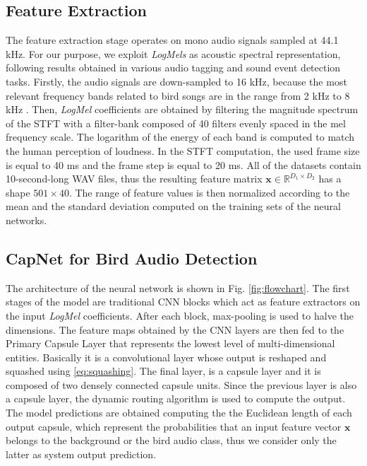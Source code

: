 \subsection{Feature Extraction}

The feature extraction stage operates on mono audio signals sampled at 44.1 kHz. For our purpose, we exploit \textit{LogMels} as acoustic spectral representation, following results obtained in various audio tagging and sound
event detection tasks. Firstly, the audio signals are down-sampled to 16 kHz, because the most relevant frequency bands related to bird songs are in the range from 2 kHz to 8 kHz \cite{payne2010handbook}. Then, \textit{LogMel} coefficients are obtained by filtering the magnitude spectrum of the STFT with a filter-bank composed of 40 filters evenly spaced in the mel frequency scale. The logarithm of the energy of each band is computed to match the human perception of loudness. In the STFT computation, the used frame size is equal to 40 ms and the frame step is equal to 20 ms. 
All of the datasets contain 10-second-long WAV files, thus the resulting feature matrix $\mathbf{x} \in \mathbb{R}^{D_1\times D_2}$ has a shape $501\times40$.
The range of feature values is then normalized according to the mean and the standard deviation computed on the training sets of the neural networks.


\subsection{CapNet for Bird Audio Detection}
The architecture of the neural network is shown in Fig. \ref{fig:flowchart}. The first stages of the model are traditional CNN blocks which act as feature extractors on the input \textit{LogMel} coefficients.
After each block, max-pooling is used to halve the dimensions. The feature maps obtained by the CNN layers are then fed to the Primary Capsule Layer that represents the lowest level of multi-dimensional entities. Basically it is a convolutional layer whose output is reshaped and squashed using \eqref{eq:squashing}. The final layer, is a capsule layer and it is composed of two densely connected capsule units.
Since the previous layer is also a capsule layer, the dynamic routing algorithm is used to compute the output. The model predictions are obtained computing the the Euclidean length of each
output capsule, which represent the probabilities that an input feature vector $\mathbf{x}$ belongs to the background or the bird audio class, thus we consider only the latter as system output prediction.

